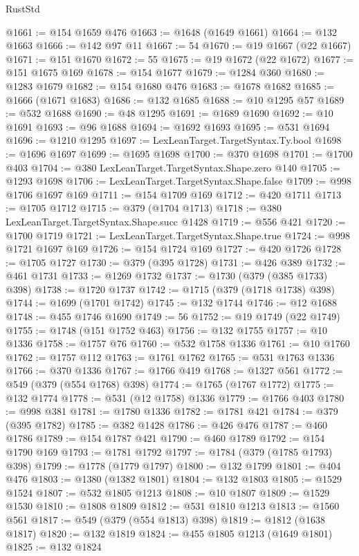 \begin{lexlean}{RustStd}
\begin{coremodule}
@1661 := @154 @1659 @476
@1663 := @1648 (@1649 @1661)
@1664 := @132 @1663
@1666 := @142 @97 @11
@1667 := 54
@1670 := @19 @1667 (@22 @1667)
@1671 := @151 @1670
@1672 := 55
@1675 := @19 @1672 (@22 @1672)
@1677 := @151 @1675 @169
@1678 := @154 @1677
@1679 := @1284 @360
@1680 := @1283 @1679
@1682 := @154 @1680 @476
@1683 := @1678 @1682
@1685 := @1666 (@1671 @1683)
@1686 := @132 @1685
@1688 := @10 @1295 @57
@1689 := @532 @1688
@1690 := @48 @1295
@1691 := @1689 @1690
@1692 := @10 @1691
@1693 := @96 @1688
@1694 := @1692 @1693
@1695 := @531 @1694
@1696 := @1210 @1295
@1697 := LexLeanTarget.TargetSyntax.Ty.bool
@1698 := @1696 @1697
@1699 := @1695 @1698
@1700 := @370 @1698
@1701 := @1700 @403
@1704 := @380 LexLeanTarget.TargetSyntax.Shape.zero @140
@1705 := @1293 @1698
@1706 := LexLeanTarget.TargetSyntax.Shape.false
@1709 := @998 @1706 @1697 @169
@1711 := @154 @1709 @169
@1712 := @420 @1711
@1713 := @1705 @1712
@1715 := @379 (@1704 @1713)
@1718 := @380 LexLeanTarget.TargetSyntax.Shape.succ @1428
@1719 := @556 @421
@1720 := @1700 @1719
@1721 := LexLeanTarget.TargetSyntax.Shape.true
@1724 := @998 @1721 @1697 @169
@1726 := @154 @1724 @169
@1727 := @420 @1726
@1728 := @1705 @1727
@1730 := @379 (@395 @1728)
@1731 := @426 @389
@1732 := @461 @1731
@1733 := @1269 @1732
@1737 := @1730 (@379 (@385 @1733) @398)
@1738 := @1720 @1737
@1742 := @1715 (@379 (@1718 @1738) @398)
@1744 := @1699 (@1701 @1742)
@1745 := @132 @1744
@1746 := @12 @1688
@1748 := @455 @1746 @1690
@1749 := 56
@1752 := @19 @1749 (@22 @1749)
@1755 := @1748 (@151 @1752 @463)
@1756 := @132 @1755
@1757 := @10 @1336
@1758 := @1757 @76
@1760 := @532 @1758 @1336
@1761 := @10 @1760
@1762 := @1757 @112
@1763 := @1761 @1762
@1765 := @531 @1763 @1336
@1766 := @370 @1336
@1767 := @1766 @419
@1768 := @1327 @561
@1772 := @549 (@379 (@554 @1768) @398)
@1774 := @1765 (@1767 @1772)
@1775 := @132 @1774
@1778 := @531 (@12 @1758) @1336
@1779 := @1766 @403
@1780 := @998 @381
@1781 := @1780 @1336
@1782 := @1781 @421
@1784 := @379 (@395 @1782)
@1785 := @382 @1428
@1786 := @426 @476
@1787 := @460 @1786
@1789 := @154 @1787 @421
@1790 := @460 @1789
@1792 := @154 @1790 @169
@1793 := @1781 @1792
@1797 := @1784 (@379 (@1785 @1793) @398)
@1799 := @1778 (@1779 @1797)
@1800 := @132 @1799
@1801 := @404 @476
@1803 := @1380 (@1382 @1801)
@1804 := @132 @1803
@1805 := @1529 @1524
@1807 := @532 @1805 @1213
@1808 := @10 @1807
@1809 := @1529 @1530
@1810 := @1808 @1809
@1812 := @531 @1810 @1213
@1813 := @1560 @561
@1817 := @549 (@379 (@554 @1813) @398)
@1819 := @1812 (@1638 @1817)
@1820 := @132 @1819
@1824 := @455 @1805 @1213 (@1649 @1801)
@1825 := @132 @1824

\end{coremodule}
\end{lexlean}
